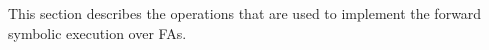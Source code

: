 {This section describes the operations that are used to
implement the forward symbolic execution over FAs. 
%
%
%
%
%
}
